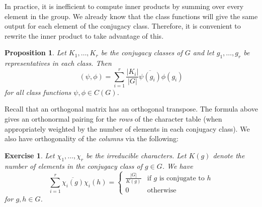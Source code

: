 \documentclass[12pt]{article}
\theoremstyle{plain}
\newtheorem{proposition}[theorem]{Proposition}
\newtheorem{exercise}[theorem]{Exercise}
\theoremstyle{definition}
\theoremstyle{remark}
\numberwithin{equation}{section}
\begin{document}
In practice, it is inefficient to compute inner products by summing over
every element in the group.  We already know that the class functions
will give the same output for each element of the conjugacy class.
Therefore, it is convenient to rewrite the inner product to take
advantage of this.

\begin{proposition}
Let $K_1, \ldots, K_r$ be the conjugacy classes of $G$
and let $g_1,\ldots, g_r$ be representatives in each class.
Then
\[
( \psi, \phi ) = \sum_{i=1}^r \frac{|K_i|}{|G|}
\overline{\psi(g_i)}\phi(g_i)
\]
for all class functions $\psi,\phi \in C(G)$.
\end{proposition}

Recall that an orthogonal matrix has an orthogonal transpose.
The formula above gives an orthonormal pairing for the
\emph{rows} of the character table (when appropriately weighted by the number of elements in
each conjugacy class).  We also have orthogonality of the
\emph{columns} via the following:

\begin{exercise}
Let $\chi_1,\ldots,\chi_r$ be the irreducible characters.
Let $K(g)$ denote the number of elements in the conjugacy class of $g \in
G$.
We have
\[
\sum_{i=1}^r \overline{\chi_i(g)} \chi_i(h) =
\begin{cases}
\frac{|G|}{K(g)} & \textrm{if $g$ is conjugate to $h$}\\
0 & \textrm{otherwise}
\end{cases}
\]
for $g, h \in G$.
\end{exercise}





\end{document}

